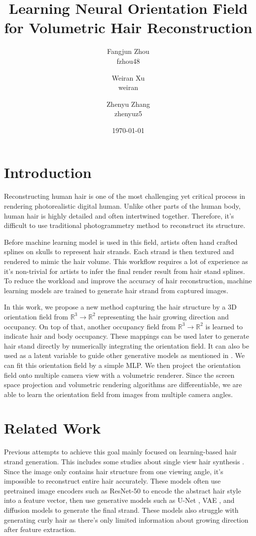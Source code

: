 \documentclass[12pt]{article}
\title{Learning Neural Orientation Field for Volumetric Hair Reconstruction}
\author{
  Fangjun Zhou \\ fzhou48
  \and Weiran Xu \\ weiran
  \and Zhenyu Zhang \\ zhenyuz5
}
\date{\today}
\begin{document}
\maketitle

\section{Introduction}

Reconstructing human hair is one of the most challenging yet critical process in rendering photorealistic digital human. Unlike other parts of the human body, human hair is highly detailed and often intertwined together. Therefore, it's difficult to use traditional photogrammetry method to reconstruct its structure.

Before machine learning model is used in this field, artists often hand crafted splines on skulls to represent hair strands. Each strand is then textured and rendered to mimic the hair volume. This workflow requires a lot of experience as it's non-trivial for artists to infer the final render result from hair stand splines. To reduce the workload and improve the accuracy of hair reconstruction, machine learning models are trained to generate hair strand from captured images.

In this work, we propose a new method capturing the hair structure by a 3D orientation field from $\mathbb{R}^{3} \rightarrow \mathbb{R}^{2}$ representing the hair growing direction and occupancy. On top of that, another occupancy field from $\mathbb{R}^{3} \rightarrow \mathbb{R}^{2}$ is learned to indicate hair and body occupancy. These mappings can be used later to generate hair stand directly by numerically integrating the orientation field. It can also be used as a latent variable to guide other generative models as mentioned in \cite{metzer_latent-nerf_2022}. We can fit this orientation field by a simple MLP. We then project the orientation field onto multiple camera view with a volumetric renderer. Since the screen space projection and volumetric rendering algorithms are differentiable, we are able to learn the orientation field from images from multiple camera angles.

\section{Related Work}

Previous attempts to achieve this goal mainly focused on learning-based hair strand generation. This includes some studies about single view hair synthesis \cite{saito_3d_2018, zheng_hairstep_2023, wu_neuralhdhair_2022, ma_single-view_nodate}. Since the image only contains hair structure from one viewing angle, it's impossible to reconstruct entire hair accurately. These models often use pretrained image encoders such as ResNet-50 \cite{saito_3d_2018} to encode the abstract hair style into a feature vector, then use generative models such as U-Net \cite{zheng_hairstep_2023}, VAE \cite{saito_3d_2018}, and diffusion models \cite{sklyarova_neural_2023} to generate the final strand. These models also struggle with generating curly hair as there's only limited information about growing direction after feature extraction.
\end{document}
